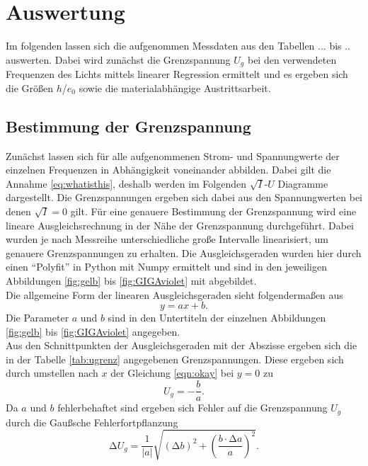 \section{Auswertung}

Im folgenden lassen sich die aufgenommen Messdaten aus den Tabellen ... bis .. auswerten. Dabei wird zunächst die Grenzspannung $U_{g}$ bei den verwendeten Frequenzen des Lichts mittels linearer Regression ermittelt und es ergeben sich
die Größen $h$/$e_{0}$ sowie die materialabhängige Austrittsarbeit.

\subsection{Bestimmung der Grenzspannung}

Zunächst lassen sich für alle aufgenommenen Strom- und Spannungwerte der einzelnen Frequenzen in Abhängigkeit voneinander abbilden. Dabei gilt die Annahme \eqref{eq:whatisthis}, deshalb werden im Folgenden $\sqrt{I}$-$U$ Diagramme dargestellt.
Die Grenzspannungen ergeben sich dabei aus den Spannungwerten bei denen $\sqrt{I} = 0$ gilt.
Für eine genauere Bestimmung der Grenzspannung wird eine lineare Ausgleichsrechnung in der Nähe der Grenzspannung durchgeführt.  Dabei wurden je nach Messreihe unterschiedliche große
Intervalle linearisiert, um genauere Grenzspannungen zu erhalten. 
Die Ausgleichsgeraden wurden hier durch einen \enquote{Polyfit} in Python mit Numpy \cite{numpy} ermittelt und sind in den jeweiligen Abbildungen \ref{fig:gelb} bis \ref{fig:GIGAviolet} mit abgebildet.
\\
Die allgemeine Form der linearen Ausgleichsgeraden sieht folgendermaßen aus
\begin{equation}
    \label{eqn:okay}
y = ax + b.
\end{equation}
Die Parameter $a$ und $b$ sind in den Untertiteln der einzelnen Abbildungen \ref{fig:gelb} bis \ref{fig:GIGAviolet} angegeben.
\\
Aus den Schnittpunkten der Ausgleichsgeraden mit der Abszisse ergeben sich die in der Tabelle \ref{tab:ugrenz} angegebenen Grenzspannungen.
Diese ergeben sich durch umstellen nach $x$ der Gleichung \eqref{eqn:okay} bei $y = 0$ zu 
\begin{equation*}
U_g = -\frac{b}{a}.
\end{equation*}
Da $a$ und $b$ fehlerbehaftet sind ergeben sich Fehler auf die Grenzspannung $U_g$ durch die Gaußsche Fehlerfortpflanzung
\begin{equation*}
\increment U_g = \frac{1}{|a|} \sqrt{(\increment b)^2 + \left( \frac{b \cdot \increment a}{a}\right)^2}.
\end{equation*}
